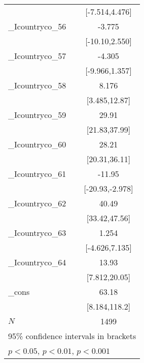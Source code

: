 {\begin{tabular}{l*{1}{c}}
            &        [-7.514,4.476]         \\
[1em]
\_Icountryco\_56&                -3.775         \\
            &        [-10.10,2.550]         \\
[1em]
\_Icountryco\_57&                -4.305         \\
            &        [-9.966,1.357]         \\
[1em]
\_Icountryco\_58&                 8.176\sym{***}\\
            &         [3.485,12.87]         \\
[1em]
\_Icountryco\_59&                 29.91\sym{***}\\
            &         [21.83,37.99]         \\
[1em]
\_Icountryco\_60&                 28.21\sym{***}\\
            &         [20.31,36.11]         \\
[1em]
\_Icountryco\_61&                -11.95\sym{**} \\
            &       [-20.93,-2.978]         \\
[1em]
\_Icountryco\_62&                 40.49\sym{***}\\
            &         [33.42,47.56]         \\
[1em]
\_Icountryco\_63&                 1.254         \\
            &        [-4.626,7.135]         \\
[1em]
\_Icountryco\_64&                 13.93\sym{***}\\
            &         [7.812,20.05]         \\
[1em]
\_cons      &                 63.18\sym{*}  \\
            &         [8.184,118.2]         \\
\hline
\(N\)       &                  1499         \\
\hline\hline
\multicolumn{2}{l}{\footnotesize 95\% confidence intervals in brackets}\\
\multicolumn{2}{l}{\footnotesize \sym{*} \(p<0.05\), \sym{**} \(p<0.01\), \sym{***} \(p<0.001\)}\\
\end{tabular}
}

